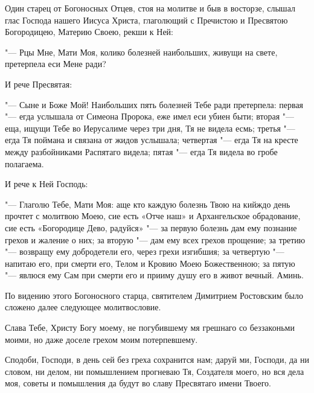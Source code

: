 {\centering{}

}

\begin{mymulticols}




Один старец от Богоносных Отцев, стоя на молитве и быв в восторзе, слышал глас Господа нашего Иисуса Христа, глаголющий с Пречистою и Пресвятою Богородицею, Материю Своею, рекши к Ней:

"--- Рцы Мне, Мати Моя, колико болезней наибольших, живущи на свете, претерпела еси Мене ради?

И рече Пресвятая:

"--- Сыне и Боже Мой! Наибольших пять болезней Тебе ради претерпела: первая "--- егда услышала от Симеона Пророка, еже имел еси убиен быти; вторая "--- еща, ищущи Тебе во Иерусалиме через три дня, Тя не видела есмь; третья "--- егда Тя поймана и связана от жидов услышала; четвертая "--- егда Тя на кресте между разбойниками Распятаго видела; пятая "--- егда Тя видела во гробе полагаема.

И рече к Ней Господь:

"--- Глаголю Тебе, Мати Моя: аще кто каждую болезнь Твою на кийждо день прочтет с молитвою Моею, сие есть «Отче наш» и Архангельское обрадование, сие есть «Богородице Дево, радуйся» "--- за первую болезнь дам ему познание грехов и жаление о них; за вторую "--- дам ему всех грехов прощение; за третию "--- возвращу ему добродетели его, через грехи изгибшия; за четвертую "--- напитаю его, при смерти его, Телом и Кровию Моею Божественною; за пятую "--- явлюся ему Сам при смерти его и прииму душу его в живот вечный. Аминь.

По видению этого Богоносного старца, святителем Димитрием Ростовским было сложено далее следующее молитвословие.


Слава Тебе, Христу Богу моему, не погубившему мя грешнаго со беззаконьми моими, но даже доселе грехом моим потерпевшему. 

Сподоби, Господи, в день сей без греха сохранится нам; даруй ми, Господи, да ни словом, ни делом, ни помышлением прогневаю Тя, Создателя моего, но вся дела моя, советы и помышления да будут во славу Пресвятаго имени Твоего. 


\end{mymulticols}
